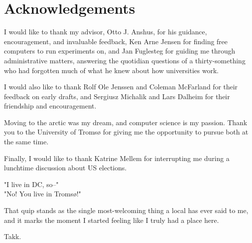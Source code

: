\chapter{Acknowledgements}

I would like to thank my advisor, Otto J. Anshus, for his guidance,
encouragement, and invaluable feedback, Ken Arne Jensen for finding free
computers to run experiments on, and Jan Fuglesteg for guiding me through
administrative matters, answering the quotidian questions of a thirty-something
who had forgotten much of what he knew about how universities work.

I would also like to thank Rolf Ole Jenssen and Coleman McFarland for their
feedback on early drafts, and Sergiusz Michalik and Lars Dalheim for their
friendship and encouragement.

Moving to the arctic was my dream, and computer science is my passion.
Thank you to the University of Tromsø for giving me the opportunity to pursue
both at the same time.

Finally, I would like to thank Katrine Mellem for interrupting me during a
lunchtime discussion about US elections.

"I live in DC, so--"\\
"No! You live in Tromsø!"

That quip stands as the single most-welcoming thing a local has ever said to me,
and it marks the moment I started feeling like I truly had a place here.

Takk.
